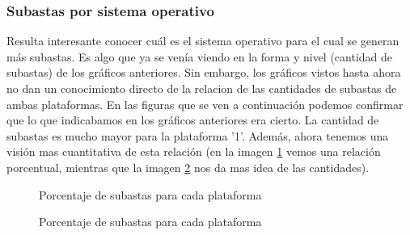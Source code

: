 \documentclass[a4paper, 12pt]{article}
\newcommand\tab[1][1cm]{\hspace*{#1}}
\begin{document}
	\subsubsection{Subastas por sistema operativo}
	\tab Resulta interesante conocer cuál es el sistema operativo para el cual se generan más subastas. Es algo que ya se venía viendo en la forma y nivel (cantidad de subastas) de los gráficos anteriores. Sin embargo, los gráficos vistos hasta ahora no dan un conocimiento directo de la relacion de las cantidades de subastas de ambas plataformas.
	\tab En las figuras que se ven a continuación podemos confirmar que lo que indicabamos en los gráficos anteriores era cierto. La cantidad de subastas es mucho mayor para la plataforma '1'. Además, ahora tenemos una visión mas cuantitativa de esta relación (en la imagen \ref{subastasSOporcentajes} vemos una relación porcentual, mientras que la imagen \ref{subastasSOcantidades} nos da mas idea de las cantidades).

	\FloatBarrier
		\begin{figure}
			\centering
		   	\caption{Porcentaje de subastas para cada plataforma}
			\label{subastasSOporcentajes}
		\end{figure}
	\FloatBarrier

	\FloatBarrier
		\begin{figure}
			\centering
		   	\caption{Porcentaje de subastas para cada plataforma}
			\label{subastasSOcantidades}
		\end{figure}
	\FloatBarrier
\end{document}
